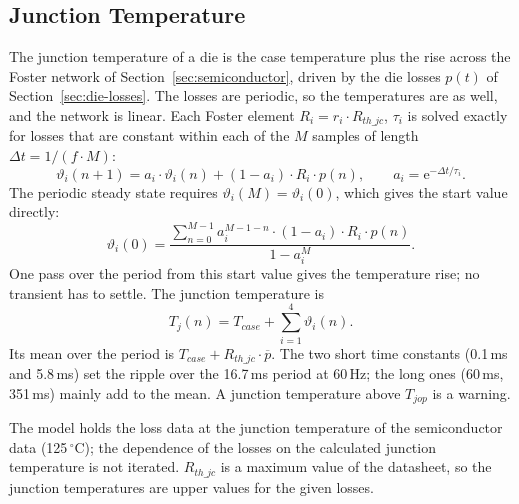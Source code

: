 \subsection{Junction Temperature}
\label{sec:junction}

The junction temperature of a die is the case temperature plus the rise across the Foster network of
Section~\ref{sec:semiconductor}, driven by the die losses $p(t)$ of Section~\ref{sec:die-losses}. The losses are
periodic, so the temperatures are as well, and the network is linear. Each Foster element $R_i = r_i \cdot R_{th\_jc}$,
$\tau_i$ is solved exactly for losses that are constant within each of the $M$ samples of length
$\Delta t = 1 / (f \cdot M)$:
\begin{equation}
  \vartheta_i(n+1) = a_i \cdot \vartheta_i(n) + (1 - a_i) \cdot R_i \cdot p(n) , \qquad
  a_i = \mathrm{e}^{-\Delta t / \tau_i} .
\end{equation}
The periodic steady state requires $\vartheta_i(M) = \vartheta_i(0)$, which gives the start value directly:
\begin{equation}
  \vartheta_i(0) = \frac{\sum_{n=0}^{M-1} a_i^{M-1-n} \cdot (1 - a_i) \cdot R_i \cdot p(n)}{1 - a_i^M} .
\end{equation}
One pass over the period from this start value gives the temperature rise; no transient has to settle. The
junction temperature is
\begin{equation}
  T_j(n) = T_{case} + \sum_{i=1}^{4} \vartheta_i(n) .
\end{equation}
Its mean over the period is $T_{case} + R_{th\_jc} \cdot \overline{p}$. The two short time constants (0.1\,ms and
5.8\,ms) set the ripple over the 16.7\,ms period at 60\,Hz; the long ones (60\,ms, 351\,ms) mainly add to the mean.
A junction temperature above $T_{jop}$ is a warning.

The model holds the loss data at the junction temperature of the semiconductor data (125\,$^{\circ}$C); the
dependence of the losses on the calculated junction temperature is not iterated. $R_{th\_jc}$ is a maximum value of
the datasheet, so the junction temperatures are upper values for the given losses.
